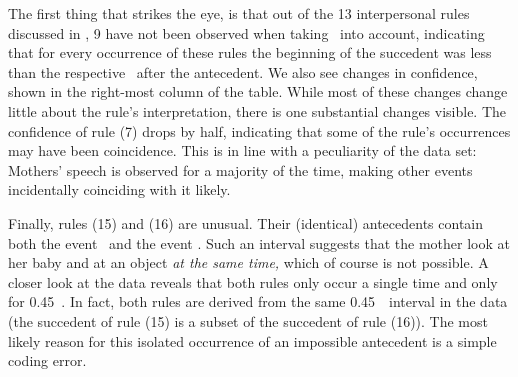 The first thing that strikes the eye, is that out of the 13 interpersonal rules discussed in \citet{rohlfing_multimodal_underreview}, 9 have not been observed when taking \rt\ into account, indicating that for every occurrence of these rules the beginning of the succedent was less than the respective \rt\ after the antecedent.
We also see changes in confidence, shown in the right-most column of the table.
While most of these changes change little about the rule's interpretation, there is one substantial changes visible.
The confidence of rule (7) drops by half, indicating that some of the rule's occurrences may have been coincidence.
This is in line with a peculiarity of the data set:
Mothers' speech is observed for a majority of the time, making other events incidentally coinciding with it likely.

Finally, rules (15) and (16) are unusual.
Their (identical) antecedents contain both the event \mogain\ and the event \mogaob.
Such an interval suggests that the mother look at her baby and at an object \emph{at the same time,} which of course is not possible.
A closer look at the data reveals that both rules only occur a single time and only for 0.45~\s.
In fact, both rules are derived from the same 0.45~\s\ interval in the data (the succedent of rule (15) is a subset of the succedent of rule (16)).
The most likely reason for this isolated occurrence of an impossible antecedent is a simple coding error.




































